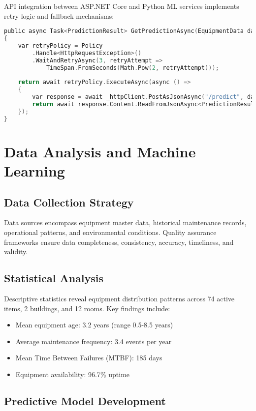 \documentclass[12pt,a4paper]{report}
\begin{document}
API integration between ASP.NET Core and Python ML services implements retry logic and fallback mechanisms:

\begin{lstlisting}[language=C, caption=ML Service Integration]
public async Task<PredictionResult> GetPredictionAsync(EquipmentData data)
{
    var retryPolicy = Policy
        .Handle<HttpRequestException>()
        .WaitAndRetryAsync(3, retryAttempt => 
            TimeSpan.FromSeconds(Math.Pow(2, retryAttempt)));
    
    return await retryPolicy.ExecuteAsync(async () =>
    {
        var response = await _httpClient.PostAsJsonAsync("/predict", data);
        return await response.Content.ReadFromJsonAsync<PredictionResult>();
    });
}
\end{lstlisting}

\chapter{Data Analysis and Machine Learning}

\section{Data Collection Strategy}

Data sources encompass equipment master data, historical maintenance records, operational patterns, and environmental conditions. Quality assurance frameworks ensure data completeness, consistency, accuracy, timeliness, and validity.

\section{Statistical Analysis}

Descriptive statistics reveal equipment distribution patterns across 74 active items, 2 buildings, and 12 rooms. Key findings include:

\begin{itemize}
    \item Mean equipment age: 3.2 years (range 0.5-8.5 years)
    \item Average maintenance frequency: 3.4 events per year
    \item Mean Time Between Failures (MTBF): 185 days
    \item Equipment availability: 96.7\% uptime
\end{itemize}

\section{Predictive Model Development}
\end{document}
